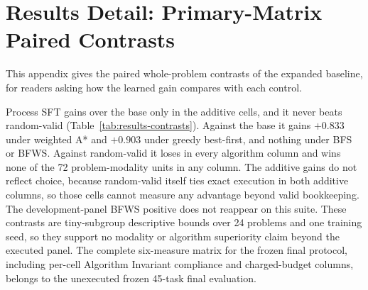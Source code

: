 \section{Results Detail: Primary-Matrix Paired Contrasts}
\label{app:results-contrasts}

This appendix gives the paired whole-problem contrasts of the expanded baseline, for readers asking how the learned gain compares with each control.

Process SFT gains over the base only in the additive cells, and it never beats random-valid (Table~\ref{tab:results-contrasts}). Against the base it gains $+0.833$ under weighted A* and $+0.903$ under greedy best-first, and nothing under BFS or BFWS. Against random-valid it loses in every algorithm column and wins none of the 72 problem-modality units in any column. The additive gains do not reflect choice, because random-valid itself ties exact execution in both additive columns, so those cells cannot measure any advantage beyond valid bookkeeping. The development-panel BFWS positive does not reappear on this suite. These contrasts are tiny-subgroup descriptive bounds over 24 problems and one training seed, so they support no modality or algorithm superiority claim beyond the executed panel. The complete six-measure matrix for the frozen final protocol, including per-cell Algorithm Invariant compliance and charged-budget columns, belongs to the unexecuted frozen 45-task final evaluation.

